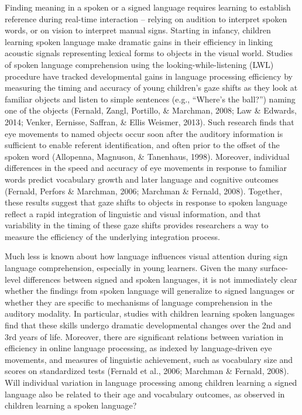 \documentclass[oneside]{report}
\begin{document}
Finding meaning in a spoken or a signed language requires learning to
establish reference during real-time interaction -- relying on audition
to interpret spoken words, or on vision to interpret manual signs.
Starting in infancy, children learning spoken language make dramatic
gains in their efficiency in linking acoustic signals representing
lexical forms to objects in the visual world. Studies of spoken language
comprehension using the looking-while-listening (LWL) procedure have
tracked developmental gains in language processing efficiency by
measuring the timing and accuracy of young children's gaze shifts as
they look at familiar objects and listen to simple sentences (e.g.,
``Where's the ball?'') naming one of the objects (Fernald, Zangl,
Portillo, \& Marchman, 2008; Law \& Edwards, 2014; Venker, Eernisse,
Saffran, \& Ellis Weismer, 2013). Such research finds that eye movements
to named objects occur soon after the auditory information is sufficient
to enable referent identification, and often prior to the offset of the
spoken word (Allopenna, Magnuson, \& Tanenhaus, 1998). Moreover,
individual differences in the speed and accuracy of eye movements in
response to familiar words predict vocabulary growth and later language
and cognitive outcomes (Fernald, Perfors \& Marchman, 2006; Marchman \&
Fernald, 2008). Together, these results suggest that gaze shifts to
objects in response to spoken language reflect a rapid integration of
linguistic and visual information, and that variability in the timing of
these gaze shifts provides researchers a way to measure the efficiency
of the underlying integration process.

Much less is known about how language influences visual attention during
sign language comprehension, especially in young learners. Given the
many surface-level differences between signed and spoken languages, it
is not immediately clear whether the findings from spoken language will
generalize to signed languages or whether they are specific to
mechanisms of language comprehension in the auditory modality. In
particular, studies with children learning spoken languages find that
these skills undergo dramatic developmental changes over the 2nd and 3rd
years of life. Moreover, there are significant relations between
variation in efficiency in online language processing, as indexed by
language-driven eye movements, and measures of linguistic achievement,
such as vocabulary size and scores on standardized tests (Fernald et
al., 2006; Marchman \& Fernald, 2008). Will individual variation in
language processing among children learning a signed language also be
related to their age and vocabulary outcomes, as observed in children
learning a spoken language?
\end{document}
